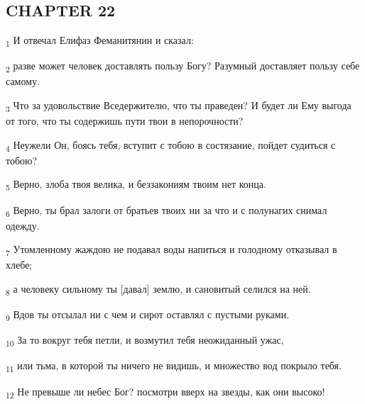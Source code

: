 \subsection{CHAPTER 22}
\begin{tcolorbox}
\textsubscript{1} И отвечал Елифаз Феманитянин и сказал:
\end{tcolorbox}
\begin{tcolorbox}
\textsubscript{2} разве может человек доставлять пользу Богу? Разумный доставляет пользу себе самому.
\end{tcolorbox}
\begin{tcolorbox}
\textsubscript{3} Что за удовольствие Вседержителю, что ты праведен? И будет ли Ему выгода от того, что ты содержишь пути твои в непорочности?
\end{tcolorbox}
\begin{tcolorbox}
\textsubscript{4} Неужели Он, боясь тебя, вступит с тобою в состязание, пойдет судиться с тобою?
\end{tcolorbox}
\begin{tcolorbox}
\textsubscript{5} Верно, злоба твоя велика, и беззакониям твоим нет конца.
\end{tcolorbox}
\begin{tcolorbox}
\textsubscript{6} Верно, ты брал залоги от братьев твоих ни за что и с полунагих снимал одежду.
\end{tcolorbox}
\begin{tcolorbox}
\textsubscript{7} Утомленному жаждою не подавал воды напиться и голодному отказывал в хлебе;
\end{tcolorbox}
\begin{tcolorbox}
\textsubscript{8} а человеку сильному ты [давал] землю, и сановитый селился на ней.
\end{tcolorbox}
\begin{tcolorbox}
\textsubscript{9} Вдов ты отсылал ни с чем и сирот оставлял с пустыми руками.
\end{tcolorbox}
\begin{tcolorbox}
\textsubscript{10} За то вокруг тебя петли, и возмутил тебя неожиданный ужас,
\end{tcolorbox}
\begin{tcolorbox}
\textsubscript{11} или тьма, в которой ты ничего не видишь, и множество вод покрыло тебя.
\end{tcolorbox}
\begin{tcolorbox}
\textsubscript{12} Не превыше ли небес Бог? посмотри вверх на звезды, как они высоко!
\end{tcolorbox}
